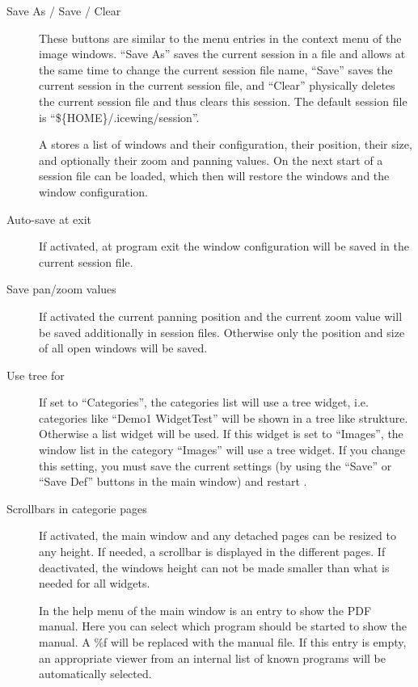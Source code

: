 \begin{description}
\item[Save As / Save / Clear] These buttons are similar to the
  menu entries in the context menu of the image windows. ``Save As''
  saves the current session in a file and allows at the same time to
  change the current session file name, ``Save'' saves the current
  session in the current session file, and ``Clear'' physically
  deletes the current session file and thus clears this session.
  The default session file is ``\$\{HOME\}/.icewing/session''.

  A  stores a list of windows and their
  configuration, their position, their size, and optionally their
  zoom and panning values. On the next start of \icewing{} a session
  file can be loaded, which then will restore the windows and the
  window configuration.

\item[Auto-save at exit] If activated, at program exit the
  \icewing{} window configuration will be saved in the current
  session file.

\item[Save pan/zoom values] 
  If activated the current panning position and the current zoom
  value will be saved additionally in session files. Otherwise only
  the position and size of all open windows will be saved.

\item[Use tree for] If set to ``Categories'', the categories list
  will use a tree widget, i.e. categories like ``Demo1 WidgetTest''
  will be shown in a tree like strukture. Otherwise a list widget
  will be used. If this widget is set to ``Images'', the window list
  in the category ``Images'' will use a tree widget. If you change
  this setting, you must save the current settings (by using the
  ``Save'' or ``Save Def'' buttons in the main window) and restart
  \icewing{}.

\item[Scrollbars in categorie pages] If activated, the \icewing{}
  main window and any detached pages can be resized to any
  height. If needed, a scrollbar is displayed in the different
  pages. If deactivated, the windows height can not be made smaller
  than what is needed for all widgets.

\item[] In the help menu of the main \icewing{} window is
  an entry to show the PDF \icewing{} manual. Here you can select
  which program should be started to show the manual. A \%f will be
  replaced with the manual file. If this entry is empty, an
  appropriate viewer from an internal list of known programs will be
  automatically selected.
\end{description}

